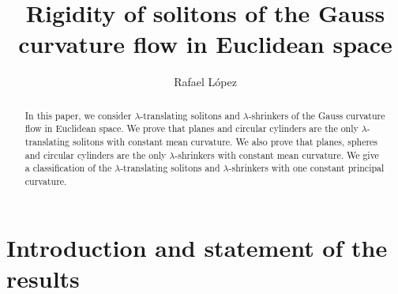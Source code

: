 \documentclass[a4paper,12pt]{amsart}
\theoremstyle{definition}
\begin{document}
\title[Rigidity of solitons of the Gauss curvature flow in Euclidean space]{Rigidity of solitons of the Gauss curvature flow in Euclidean space}
\author{Rafael L\'opez}
\address{ Departamento de Geometr\'{\i}a y Topolog\'{\i}a\\ Universidad de Granada. 18071 Granada, Spain}

  
 


\begin{abstract}  In this paper, we consider $\lambda$-translating solitons and $\lambda$-shrinkers of the Gauss curvature flow in Euclidean space. We prove that planes and circular cylinders are the only $\lambda$-translating solitons with constant mean curvature. We also prove that planes, spheres and circular cylinders are the only $\lambda$-shrinkers  with constant mean curvature. We give a classification of the $\lambda$-translating solitons and $\lambda$-shrinkers with one constant principal curvature.
\end{abstract}

\maketitle

 
 
  
\section{Introduction and statement of the results}
\end{document}
